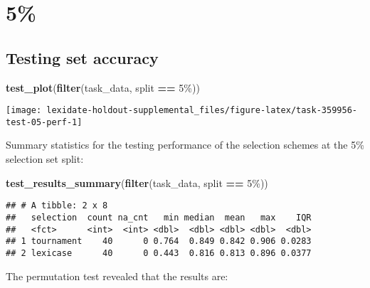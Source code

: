 \documentclass[
]{book}
\newenvironment{Shaded}{\begin{snugshade}}{\end{snugshade}}
\newcommand{\FunctionTok}[1]{\textcolor[rgb]{0.13,0.29,0.53}{\textbf{#1}}}
\newcommand{\NormalTok}[1]{#1}
\newcommand{\SpecialCharTok}[1]{\textcolor[rgb]{0.81,0.36,0.00}{\textbf{#1}}}
\newcommand{\StringTok}[1]{\textcolor[rgb]{0.31,0.60,0.02}{#1}}
\begin{document}
\hypertarget{section-25}{%
\section{5\%}\label{section-25}}

\hypertarget{testing-set-accuracy-25}{%
\subsection{Testing set accuracy}\label{testing-set-accuracy-25}}

\begin{Shaded}
\begin{Highlighting}[]
\FunctionTok{test\_plot}\NormalTok{(}\FunctionTok{filter}\NormalTok{(task\_data, split }\SpecialCharTok{==} \StringTok{\textquotesingle{}5\%\textquotesingle{}}\NormalTok{))}
\end{Highlighting}
\end{Shaded}

\texttt{[image: lexidate-holdout-supplemental\_files/figure-latex/task-359956-test-05-perf-1]}

Summary statistics for the testing performance of the selection schemes at the 5\% selection set split:

\begin{Shaded}
\begin{Highlighting}[]
\FunctionTok{test\_results\_summary}\NormalTok{(}\FunctionTok{filter}\NormalTok{(task\_data, split }\SpecialCharTok{==} \StringTok{\textquotesingle{}5\%\textquotesingle{}}\NormalTok{))}
\end{Highlighting}
\end{Shaded}

\begin{verbatim}
## # A tibble: 2 x 8
##   selection  count na_cnt   min median  mean   max    IQR
##   <fct>      <int>  <int> <dbl>  <dbl> <dbl> <dbl>  <dbl>
## 1 tournament    40      0 0.764  0.849 0.842 0.906 0.0283
## 2 lexicase      40      0 0.443  0.816 0.813 0.896 0.0377
\end{verbatim}

The permutation test revealed that the results are:
\end{document}
